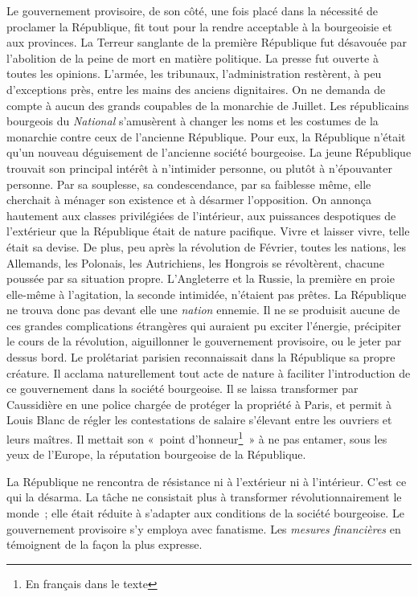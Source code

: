 \documentclass[french,twoside]{book} %
\begin{document}
Le gouvernement provisoire, de son côté, une fois placé dans la nécessité de proclamer la République, fit tout pour la rendre acceptable à la bourgeoisie et aux provinces. La Terreur sanglante de la première République fut désavouée par l’abolition de la peine de mort en matière politique. La presse fut ouverte à toutes les opinions. L’armée, les tribunaux, l’administration restèrent, à peu d’exceptions près, entre les mains des anciens dignitaires. On ne demanda de compte à aucun des grands coupables de la monarchie de Juillet. Les républicains bourgeois du \emph{National} s’amusèrent à changer les noms et les costumes de la monarchie contre ceux de l’ancienne République. Pour eux, la République n’était qu’un nouveau déguisement de l’ancienne société bourgeoise. La jeune République trouvait son principal intérêt à n’intimider personne, ou plutôt à n’épouvanter personne. Par sa souplesse, sa condescendance, par sa faiblesse même, elle cherchait à ménager son existence et à désarmer l’opposition. On annonça hautement aux classes privilégiées de l’intérieur, aux puissances despotiques de l’extérieur que la République était de nature pacifique. Vivre et laisser vivre, telle était sa devise. De plus, peu après la révolution de Février, toutes les nations, les Allemands, les Polonais, les Autrichiens, les Hongrois se révoltèrent, chacune poussée par sa situation propre. L’Angleterre et la Russie, la première en proie elle-même à l’agitation, la seconde intimidée, n’étaient pas prêtes. La République ne trouva donc pas devant elle une \emph{nation} ennemie. Il ne se produisit aucune de ces grandes complications étrangères qui auraient pu exciter l’énergie, précipiter le cours de la révolution, aiguillonner le gouvernement provisoire, ou le jeter par dessus bord. Le prolétariat parisien reconnaissait dans la République sa propre créature. Il acclama naturellement tout acte de nature à faciliter l’introduction de ce gouvernement dans la société bourgeoise. Il se laissa transformer par Caussidière en une police chargée de protéger la propriété à Paris, et permit à Louis Blanc de régler les contestations de salaire s’élevant entre les ouvriers et leurs maîtres. Il mettait son « point d’honneur\footnote{En français dans le texte} » à ne pas entamer, sous les yeux de l’Europe, la réputation bourgeoise de la République.\par
La République ne rencontra de résistance ni à l’extérieur ni à l’intérieur. C’est ce qui la désarma. La tâche ne consistait plus à transformer révolutionnairement le monde ; elle était réduite à s’adapter aux conditions de la société bourgeoise. Le gouvernement provisoire s’y employa avec fanatisme. Les \emph{mesures financières} en témoignent de la façon la plus expresse.\par
\end{document}
